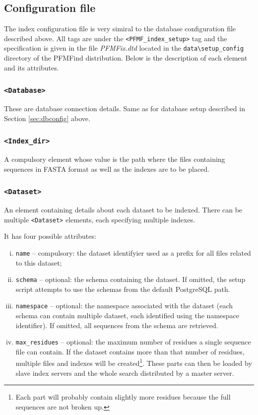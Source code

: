 \documentclass[11pt]{article}
\begin{document}
\subsection{Configuration file}\label{sec:ixconfig}

The index configuration file is very simiral to the database configuration file described above. All tags are under the {\tt <PFMF\_index\_setup>} tag and the specification is given in the file {\it PFMFix.dtd} located in the \verb|data\setup_config| directory of the PFMFind distribution. Below is the description of each element and its attributes.

\subsubsection*{{\tt <Database>}}

These are database connection details. Same as for database setup described in Section \ref{sec:dbconfig} above.

\subsubsection*{\texttt{<Index\_dir>}}

A compulsory element whose value is the path where the files containing sequences in FASTA format as well as the indexes are to be placed.

\subsubsection*{\texttt{<Dataset>}}

An element containing details about each dataset to be indexed. There can be multiple \texttt{<Dataset>} elements, each specifying multiple indexes.

It has four possible attributes:
\begin{enumerate}[(i)]
\item \texttt{name} -- compulsory: the dataset identifyier used as a prefix for all files related to this dataset;
\item \texttt{schema} -- optional: the schema containing the dataset. If omitted, the setup script attempts to use the schemas from the default PostgreSQL path.
\item \texttt{namespace} -- optional: the namespace associated with the dataset (each schema can contain multiple dataset, each identified using the namespace identifier). If omitted, all sequences from the schema are retrieved.
\item \texttt{max\_residues} -- optional: the maximum number of residues a single sequence file can contain. If the dataset contains more than that number of residues, multiple files and indexes will be created\footnote{Each part will probably contain slightly more residues because the full sequences are not broken up.}. These parts can then be loaded by slave index servers and the whole search distributed by a master server.
\end{enumerate}
\end{document}
